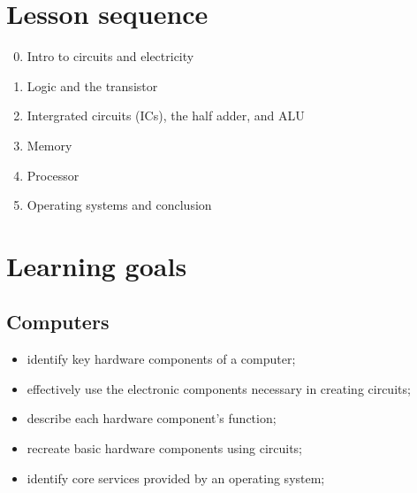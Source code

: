 \documentclass[11pt]{article}
\begin{document}
\vfill
\section*{Lesson sequence}

\begin{enumerate}
    \setcounter{enumi}{-1}
  \item Intro to circuits and electricity
  \item Logic and the transistor
  \item Intergrated circuits (ICs), the half adder, and ALU
  \item Memory
  \item Processor
  \item Operating systems and conclusion
\end{enumerate}

\section*{Learning goals}

\subsection*{Computers}

\begin{itemize}
  \item identify key hardware components of a computer;
  \item effectively use the electronic components necessary in creating circuits;
  \item describe each hardware component's function;
  \item recreate basic hardware components using circuits;
  \item identify core services provided by an operating system;
\end{itemize}
\end{document}
